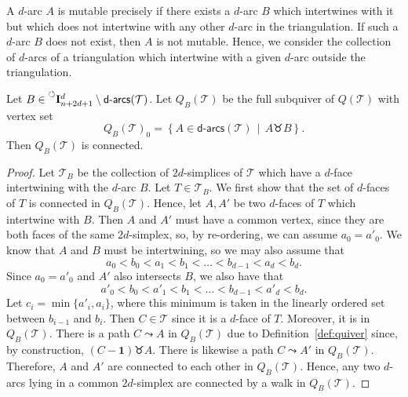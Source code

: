 \documentclass[ALCO,Unicode,published]{cedram}
\newcommand{\nonconsec}[2]{\prescript{\circlearrowleft}{}{\mathbf{I}_{#1}^{#2}}}
\newcommand{\st}{\,\middle\vert\,} %
\newcommand{\set}[1]{\left\{#1\right\}} %
\newcommand{\onevec}{\mathbf{1}} %
\newcommand{\darcs}[1]{\mathsf{d}\text{-}\mathsf{arcs}(#1)} %
\newcommand{\swr}{\taurus} %
\begin{document}
A $d$-arc $A$ is mutable precisely if there exists a $d$-arc $B$ which intertwines with it but which does not intertwine with any other $d$-arc in the triangulation. If such a $d$-arc $B$ does not exist, then $A$ is not mutable. Hence, we consider the collection of $d$-arcs of a triangulation which intertwine with a given $d$-arc outside the triangulation.

\begin{lemma}\label{lem:connected}
Let $B \in \nonconsec{n+2d+1}{d} \setminus \darcs{\mathcal{T}}$. Let $Q_{B}(\mathcal{T})$ be the full subquiver of $Q(\mathcal{T})$ with vertex set \[Q_{B}(\mathcal{T})_{0} = \set{ A \in \darcs{\mathcal{T}} \st A \swr B }.\] Then $Q_{B}(\mathcal{T})$ is connected.
\end{lemma}
\begin{proof}
Let $\mathcal{T}_{B}$ be the collection of $2d$-simplices of $\mathcal{T}$ which have a $d$-face intertwining with the $d$-arc $B$. Let $T \in \mathcal{T}_{B}$. We first show that the set of $d$-faces of $T$ is connected in $Q_{B}(\mathcal{T})$. Hence, let $A, A'$ be two $d$-faces of $T$ which intertwine with $B$. Then $A$ and $A'$ must have a common vertex, since they are both faces of the same $2d$-simplex, so, by re-ordering, we can assume $a_{0}=a'_{0}$. We know that $A$ and $B$ must be intertwining, so we may also assume that \[a_{0} < b_{0} < a_{1} < b_{1} < \dots < b_{d-1} < a_{d} < b_{d}.\] Since $a_{0} = a'_{0}$ and $A'$ also intersects $B$, we also have that \[a'_{0} < b_{0} < a'_{1} < b_{1} < \dots < b_{d-1} < a'_{d} < b_{d}.\] Let $c_{i} = \min\{a'_{i}, a_{i}\}$, where this minimum is taken in the linearly ordered set between $b_{i - 1}$ and $b_{i}$. Then $C \in \mathcal{T}$ since it is a $d$-face of $T$. Moreover, it is in $Q_{B}(\mathcal{T})$. There is a path $C \leadsto A$ in $Q_{B}(\mathcal{T})$ due to Definition~\ref{def:quiver} since, by construction, $(C - \onevec) \swr A$. There is likewise a path $C \leadsto A'$ in $Q_{B}(\mathcal{T})$. Therefore, $A$ and $A'$ are connected to each other in $Q_{B}(\mathcal{T})$. Hence, any two $d$-arcs lying in a common $2d$-simplex are connected by a walk in $Q_{B}(\mathcal{T})$.


\end{proof}
\end{document}
